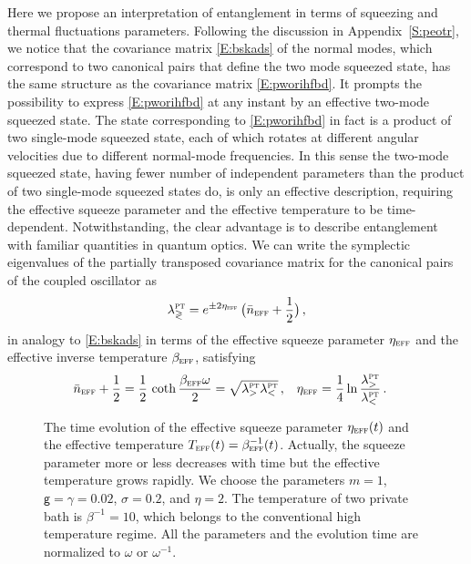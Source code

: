 \documentclass[11pt,a4paper]{article}
\begin{document}
 Here we propose an interpretation of entanglement in terms of squeezing and thermal fluctuations parameters. Following the discussion in Appendix~\ref{S:peotr}, we notice that the covariance matrix \eqref{E:bskads} of the normal modes, which correspond to two canonical pairs that define the two mode squeezed state, has the same structure as the covariance matrix \eqref{E:pworihfbd}. It prompts the possibility to express \eqref{E:pworihfbd} at any instant by an effective two-mode squeezed state. The state corresponding to \eqref{E:pworihfbd} in fact is a product of two single-mode squeezed state, each of which rotates at different angular velocities due to different normal-mode frequencies. In this sense the two-mode squeezed state, having fewer number of independent parameters than the product of two single-mode squeezed states do, is only an effective description, requiring the effective squeeze parameter and the effective temperature to be time-dependent. Notwithstanding, the clear advantage is to describe entanglement with familiar quantities in quantum optics. We can write the symplectic eigenvalues of the partially transposed covariance matrix for the canonical pairs of the coupled oscillator as
\begin{equation}\label{E:ewtdgs}
	\lambda^{\textsc{pt}}_{\gtrless}=e^{\pm2\eta_{\textsc{eff}}}\,\bigl(\bar{n}_{\textsc{eff}}+\frac{1}{2}\bigr)\,,
\end{equation}
in analogy to \eqref{E:bskads} in terms of the effective squeeze parameter $\eta_{\textsc{eff}}$ and the effective inverse temperature $\beta_{\textsc{eff}}$, satisfying
\begin{align}
    \bar{n}_{\textsc{eff}}+\frac{1}{2}=\frac{1}{2}\,\coth\frac{\beta_{\textsc{eff}}\omega}{2}&=\sqrt{\lambda_{>}^{\textsc{pt}}\lambda_{<}^{\textsc{pt}}}\,,&\eta_{\textsc{eff}}&=\frac{1}{4}\ln\frac{\lambda^{\textsc{pt}}_{>}}{\lambda^{\textsc{pt}}_{<}}\,.
\end{align}    
\begin{figure}
\centering
    \caption{The time evolution of the effective squeeze parameter $\eta_{\textsc{eff}}(t)$ and the effective temperature $T_{\textsc{eff}}(t)=\beta_{\textsc{eff}}^{-1}(t)$.  Actually, the squeeze parameter more or less decreases with time but the effective temperature grows rapidly. We choose the parameters $m=1$, $\mathsf{g}=\gamma=0.02$, $\sigma=0.2$, and $\eta=2$. The temperature of two private bath is $\beta^{-1}=10$, which belongs to the conventional high temperature regime. All the parameters and the evolution time are normalized to $\omega$ or $\omega^{-1}$.}\label{Fi:AO_effective}
\end{figure}
\end{document}
